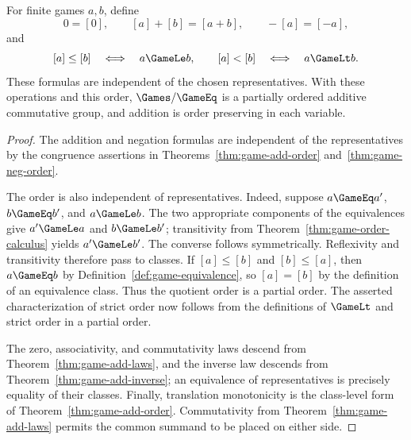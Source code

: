 \begin{theorem}
  \label{thm:game-quotient-ordered-add-group}
  \leanok
  For finite games \(a,b\), define
  \[
    0=[0],\qquad [a]+[b]=[a+b],\qquad -[a]=[-a],
  \]
  and
  \[
    [a]\leq[b]\quad\Longleftrightarrow\quad a\GameLe b,
    \qquad
    [a]<[b]\quad\Longleftrightarrow\quad a\GameLt b.
  \]
  These formulas are independent of the chosen representatives.  With these operations and
  this order, \(\Games/{\GameEq}\) is a partially ordered additive commutative group, and
  addition is order preserving in each variable.
\end{theorem}
\begin{proof}
  \leanok
  The addition and negation formulas are independent of the representatives by the
  congruence assertions in Theorems~\ref{thm:game-add-order}
  and~\ref{thm:game-neg-order}.

  The order is also independent of representatives.  Indeed, suppose
  \(a\GameEq a'\), \(b\GameEq b'\), and \(a\GameLe b\).  The two appropriate
  components of the equivalences give \(a'\GameLe a\) and
  \(b\GameLe b'\); transitivity from
  Theorem~\ref{thm:game-order-calculus} yields \(a'\GameLe b'\).  The converse
  follows symmetrically.  Reflexivity and transitivity therefore pass to
  classes.  If \([a]\leq[b]\) and \([b]\leq[a]\), then
  \(a\GameEq b\) by Definition~\ref{def:game-equivalence}, so \([a]=[b]\) by the
  definition of an equivalence class.  Thus the quotient order is a partial
  order.  The asserted characterization of strict order now follows from the
  definitions of \(\GameLt\) and strict order in a partial order.

  The zero, associativity, and commutativity laws descend from
  Theorem~\ref{thm:game-add-laws}, and the inverse law descends from
  Theorem~\ref{thm:game-add-inverse}; an equivalence of representatives is
  precisely equality of their classes.  Finally, translation monotonicity is
  the class-level form of Theorem~\ref{thm:game-add-order}.  Commutativity from
  Theorem~\ref{thm:game-add-laws} permits the common summand to be placed on
  either side.
\end{proof}


